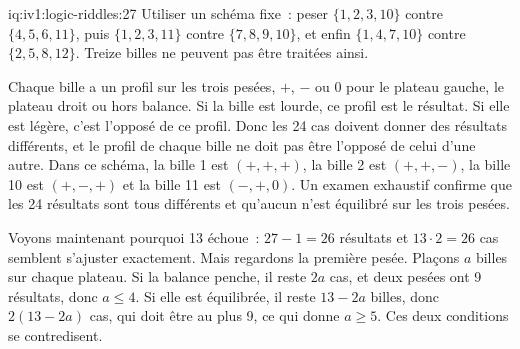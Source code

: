 \begin{solution}{iq:iv1:logic-riddles:27}
Utiliser un schéma fixe~: peser $\{1, 2, 3, 10\}$ contre $\{4, 5, 6, 11\}$, puis $\{1, 2, 3, 11\}$ contre $\{7, 8, 9, 10\}$, et enfin $\{1, 4, 7, 10\}$ contre $\{2, 5, 8, 12\}$. Treize billes ne peuvent pas être traitées ainsi.

Chaque bille a un profil sur les trois pesées, $+$, $-$ ou $0$ pour le plateau gauche, le plateau droit ou hors balance. Si la bille est lourde, ce profil est le résultat. Si elle est légère, c'est l'opposé de ce profil. Donc les 24 cas doivent donner des résultats différents, et le profil de chaque bille ne doit pas être l'opposé de celui d'une autre. Dans ce schéma, la bille 1 est $(+, +, +)$, la bille 2 est $(+, +, -)$, la bille 10 est $(+, -, +)$ et la bille 11 est $(-, +, 0)$. Un examen exhaustif confirme que les 24 résultats sont tous différents et qu'aucun n'est équilibré sur les trois pesées.

Voyons maintenant pourquoi 13 échoue~: $27 - 1 = 26$ résultats et $13 \cdot 2 = 26$ cas semblent s'ajuster exactement. Mais regardons la première pesée. Plaçons $a$ billes sur chaque plateau. Si la balance penche, il reste $2a$ cas, et deux pesées ont 9 résultats, donc $a \le 4$. Si elle est équilibrée, il reste $13 - 2a$ billes, donc $2(13 - 2a)$ cas, qui doit être au plus 9, ce qui donne $a \ge 5$. Ces deux conditions se contredisent.

\end{solution}

